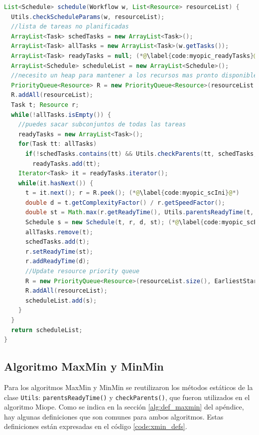 \begin{lstlisting}[language=java,label={code:myopic},caption={Algoritmo Miope},float]
List<Schedule> schedule(Workflow w, List<Resource> resourceList) {
  Utils.checkScheduleParams(w, resourceList);
  //lista de tareas no planificadas
  ArrayList<Task> schedTasks = new ArrayList<Task>();
  ArrayList<Task> allTasks = new ArrayList<Task>(w.getTasks());
  ArrayList<Task> readyTasks = null; (*@\label{code:myopic_readyTasks}@*)
  ArrayList<Schedule> scheduleList = new ArrayList<Schedule>();
  //necesito un heap para mantener a los recursos mas pronto disponibles
  PriorityQueue<Resource> R = new PriorityQueue<Resource>(resourceList.size(), EarliestStartTimeComparator.getComp()); (*@\label{code:myopic_R}@*)
  R.addAll(resourceList);
  Task t; Resource r;
  while(!allTasks.isEmpty()) {
    //puedes sacar subconjuntos de todas las tareas
    readyTasks = new ArrayList<Task>();
    for(Task tt: allTasks)
      if(!schedTasks.contains(tt) && Utils.checkParents(tt, schedTasks, w)) (*@\label{code:myopic_checkParents}@*)
        readyTasks.add(tt);
    Iterator<Task> it = readyTasks.iterator();
    while(it.hasNext()) {
      t = it.next(); r = R.peek(); (*@\label{code:myopic_scIni}@*)
      double d = t.getComplexityFactor() / r.getSpeedFactor();
      double st = Math.max(r.getReadyTime(), Utils.parentsReadyTime(t, scheduleList, w)); (*@\label{code:myopic_scPRT}@*)
      Schedule s = new Schedule(t, r, d, st); (*@\label{code:myopic_scEnd}@*)
      allTasks.remove(t);
      schedTasks.add(t);
      r.setReadyTime(st);
      r.addReadyTime(d);
      //Update resource priority queue
      R = new PriorityQueue<Resource>(resourceList.size(), EarliestStartTimeComparator.getComp()); (*@\label{code:myopic_updateR}@*)
      R.addAll(resourceList);
      scheduleList.add(s);
    }
  }
  return scheduleList;
}
\end{lstlisting}

\subsection{Algoritmo MaxMin y MinMin}
Para los algoritmos MaxMin y MinMin se reutilizaron los métodos estáticos de la clase \texttt{Utils}: \texttt{parentsReadyTime()} y \texttt{checkParents()}, que fueron utilizados en el algoritmo Miope. Como se indica en la sección \ref{alg:def_maxmin} del apéndice, hay algunas definiciones que son comunes para ambos algoritmos. Estas definiciones están expresadas en el código \ref{code:xmin_defs}.

